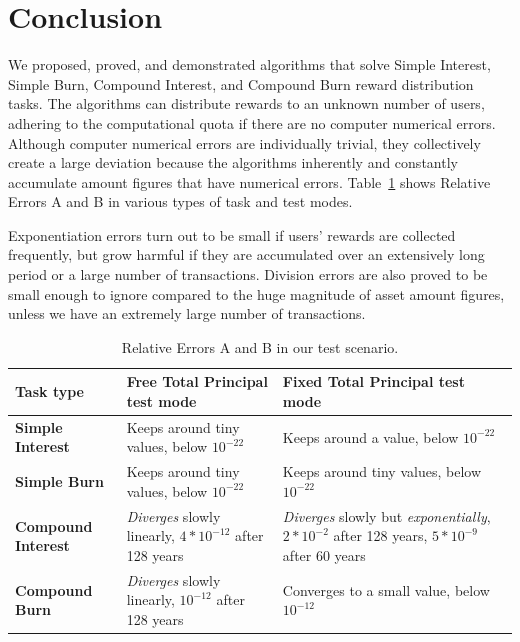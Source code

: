 \documentclass{article}
\begin{document}
\section{Conclusion}
\label{sec:Conclusion}

We proposed, proved, and demonstrated algorithms that solve Simple Interest,
Simple Burn, Compound Interest, and Compound Burn reward distribution tasks. 
The algorithms can distribute rewards to an unknown number of users, 
adhering to the computational quota  
if there are no computer numerical errors.
Although computer numerical errors are individually trivial, 
they collectively create a large deviation because the algorithms 
inherently and constantly accumulate amount figures that have numerical errors.
Table~\ref{tbl:RelativeErrors} shows Relative Errors A and B in 
various types of task and test modes.

Exponentiation errors turn out to be small if users' rewards are collected frequently, 
but grow harmful if they are accumulated over 
an extensively long period or a large number of transactions.
Division errors are also proved 
to be small enough to ignore compared to the huge magnitude of asset amount figures, 
unless we have an extremely large number of transactions.

\begin{table}[H]
    \begin{spacing}{1.8}\centering
      \fontsize{8pt}{8pt}\selectfont
      \begin{tabular} {|m{2.4cm}|m{5.6cm}|m{6cm}|}
      \hline
      {\textbf{Task type}} & {\textbf{Free Total Principal test mode}} & {\textbf{Fixed Total Principal test mode}} \\
      \hline
      {\textbf{Simple Interest}} & {Keeps around tiny values, below $10^{-22}$} & {Keeps around a value, below $10^{-22}$} \\[3mm]
      \hline
      {\textbf{Simple Burn}} & {Keeps around tiny values, below $10^{-22}$} & {Keeps around tiny values, below $10^{-22}$} \\[3mm]
      \hline
      {\textbf{Compound Interest}} & {\textit{Diverges} slowly linearly, $4 * 10^{-12}$ after 128 years } & {\textit{Diverges} slowly but \textit{exponentially}, \newline $2 * 10^{-2}$ after 128 years, $5 * 10^{-9}$ after 60 years } \\[3mm]
      \hline
      {\textbf{Compound Burn}} & {\textit{Diverges} slowly linearly, $10^{-12}$ after 128 years} & {Converges to a small value, below $10^{-12}$} \\[3mm]
      \hline
    \end{tabular}
    \end{spacing}
  \caption {Relative Errors A and B in our test scenario.
  }
  \label{tbl:RelativeErrors}
  \end{table}
\end{document}

